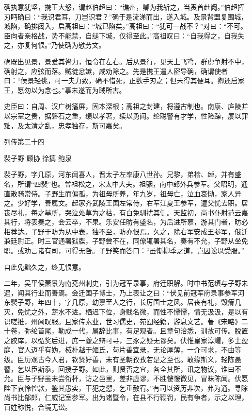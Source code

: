\documentclass[12pt,UTF8]{ctexbook}
\begin{document}
确执意犹坚，携王大怒，谓赵伯超曰：“谯州，卿为我斩之，当赉首赴阙。”伯超挥刃眄确曰：“我识君耳，刀岂识君？”确于是流涕而出，遂入城。及景背盟复围城，城陷，确排闼入，启高祖曰：“城已陷矣。”高祖曰：“犹可一战不？”对曰：“不可。臣向者亲格战，势不能禁，自缒下城，仅得至此。”高祖叹曰：“自我得之，自我失之，亦复何恨。”乃使确为慰劳文。

确既出见景，景爱其膂力，恒令在左右。后从景行，见天上飞鸢，群虏争射不中，确射之，应弦而落。贼徒忿嫉，咸劝除之。先是携王遣人密导确，确谓使者曰：“侯景轻佻，可一夫力致，确不惜死，正欲手刃之；但未得其便耳。卿还启家王，愿勿以为念也。”事未遂而为贼所害。

史臣曰：自周、汉广树籓屏，固本深根；高祖之封建，将遵古制也。南康、庐陵并以宗室之贵，据磐石之重，绩以孝著，续以勇闻。纶聪警有才学，性险躁，屡以罪黜，及太清之乱，忠孝独存，斯可嘉矣。





列传第二十四

裴子野 顾协 徐摛 鲍泉

裴子野，字几原，河东闻喜人，晋太子左率康八世孙。兄黎，弟楷、绰，并有盛名，所谓“四裴”也。曾祖松之，宋太中大夫。祖骃，南中郎外兵参军。父昭明，通直散骑常侍。子野生而偏孤，为祖母所养，年九岁，祖母亡，泣血哀恸，家人异之。少好学，善属文。起家齐武陵王国左常侍，右军江夏王参军，遭父忧去职。居丧尽礼，每之墓所，哭泣处草为之枯，有白兔驯扰其侧。天监初，尚书仆射范云嘉其行，将表奏之，会云卒，不果。乐安任昉有盛名，为后进所慕，游其门者，昉必相荐达。子野于昉为从中表，独不至，昉亦恨焉。久之，除右军安成王参军，俄迁兼廷尉正。时三官通署狱牒，子野尝不在，同僚辄署其名，奏有不允，子野从坐免职。或劝言诸有司，可得无咎。子野笑而答曰：“虽惭柳季之道，岂因讼以受服。”

自此免黜久之，终无恨意。

二年，吴平侯萧景为南兗州刺史，引为冠军录事，府迁职解。时中书范缜与子野未遇，闻其行业而善焉。会迁国子博士，乃上表让之曰：“伏见前冠军府录事参军河东裴子野，年四十，字几原，幼禀至人之行，长厉国士之风。居丧有礼，毁瘠几灭，免忧之外，蔬水不进。栖迟下位，身贱名微，而性不憛憛，情无汲汲，是以有识嗟推，州闾叹服。且家传素业，世习儒史，苑囿经籍，游息文艺。著《宋略》二十卷，弥纶首尾，勒成一代，属辞比事，有足观者。且章句洽悉，训故可传。脱置之胶庠，以弘奖后进，庶一夔之辩可寻，三豕之疑无谬矣。伏惟皇家淳耀，多士盈庭，官人迈乎有妫，棫朴越于姬氏，苟片善宜录，无论厚薄，一介可求，不由等级。臣历观古今人君，钦贤好善，未有圣朝孜孜若是之至也。敢缘斯义，轻陈愚瞽，乞以臣斯忝，回授子野。如此，则贤否之宜，各全其所，讯之物议，谁曰不允。臣与子野虽未尝衔杯，访之邑里，差非虚谬，不胜慺慺微见，冒昧陈闻。伏愿陛下哀怜悾款，鉴其愚实，干犯之愆，乞垂赦宥。”有司以资历非次，弗为通。寻除尚书比部郎，仁威记室参军。出为诸暨令，在县不行鞭罚，民有争者，示之以理，百姓称悦，合境无讼。
\end{document}
